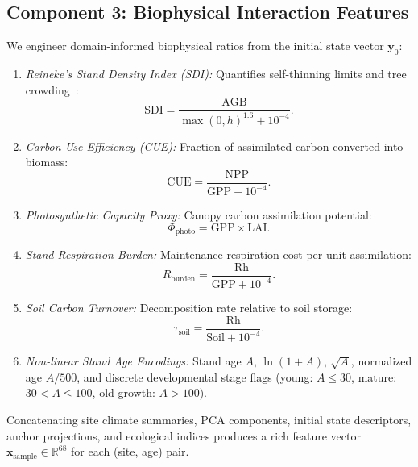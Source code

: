 \documentclass[conference]{IEEEtran}
\begin{document}
\subsection{Component 3: Biophysical Interaction Features}
We engineer domain-informed biophysical ratios from the initial state vector $\mathbf{y}_0$:
\begin{enumerate}
    \item \textit{Reineke's Stand Density Index (SDI):} Quantifies self-thinning limits and tree crowding~\cite{reineke1933perfecting}:
    \begin{equation}
        \text{SDI} = \frac{\text{AGB}}{\max(0, h)^{1.6} + 10^{-4}}.
    \end{equation}
    \item \textit{Carbon Use Efficiency (CUE):} Fraction of assimilated carbon converted into biomass:
    \begin{equation}
        \text{CUE} = \frac{\text{NPP}}{\text{GPP} + 10^{-4}}.
    \end{equation}
    \item \textit{Photosynthetic Capacity Proxy:} Canopy carbon assimilation potential:
    \begin{equation}
        \Phi_{\text{photo}} = \text{GPP} \times \text{LAI}.
    \end{equation}
    \item \textit{Stand Respiration Burden:} Maintenance respiration cost per unit assimilation:
    \begin{equation}
        R_{\text{burden}} = \frac{\text{Rh}}{\text{GPP} + 10^{-4}}.
    \end{equation}
    \item \textit{Soil Carbon Turnover:} Decomposition rate relative to soil storage:
    \begin{equation}
        \tau_{\text{soil}} = \frac{\text{Rh}}{\text{Soil} + 10^{-4}}.
    \end{equation}
    \item \textit{Non-linear Stand Age Encodings:} Stand age $A$, $\ln(1 + A)$, $\sqrt{A}$, normalized age $A / 500$, and discrete developmental stage flags (young: $A \le 30$, mature: $30 < A \le 100$, old-growth: $A > 100$).
\end{enumerate}

Concatenating site climate summaries, PCA components, initial state descriptors, anchor projections, and ecological indices produces a rich feature vector $\mathbf{x}_{\text{sample}} \in \mathbb{R}^{68}$ for each (site, age) pair.
\end{document}
